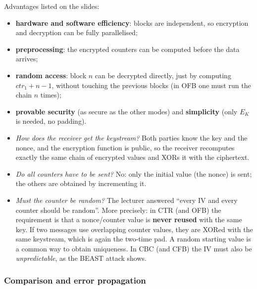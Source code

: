 Advantages listed on the slides:
\begin{itemize}
    \item \textbf{hardware and software efficiency}: blocks are independent, so encryption and decryption can be fully parallelised;
    \item \textbf{preprocessing}: the encrypted counters can be computed before the data arrives;
    \item \textbf{random access}: block $n$ can be decrypted directly, just by computing $\mathit{ctr}_1 + n - 1$, without touching the previous blocks (in OFB one must run the chain $n$ times);
    \item \textbf{provable security} (as secure as the other modes) and \textbf{simplicity} (only $E_K$ is needed, no padding).
\end{itemize}

\begin{remark}
\leavevmode
\begin{itemize}
    \item \emph{How does the receiver get the keystream?} Both parties know the key and the nonce, and the encryption function is public, so the receiver recomputes exactly the same chain of encrypted values and XORs it with the ciphertext.
    \item \emph{Do all counters have to be sent?} No: only the initial value (the nonce) is sent; the others are obtained by incrementing it.
    \item \emph{Must the counter be random?} The lecturer answered \enquote{every IV and every counter should be random}. More precisely: in CTR (and OFB) the requirement is that a nonce/counter value is \textbf{never reused} with the same key. If two messages use overlapping counter values, they are XORed with the same keystream, which is again the two-time pad. A random starting value is a common way to obtain uniqueness. In CBC (and CFB) the IV must also be \emph{unpredictable}, as the BEAST attack shows.
\end{itemize}
\end{remark}

\subsubsection{Comparison and error propagation}

